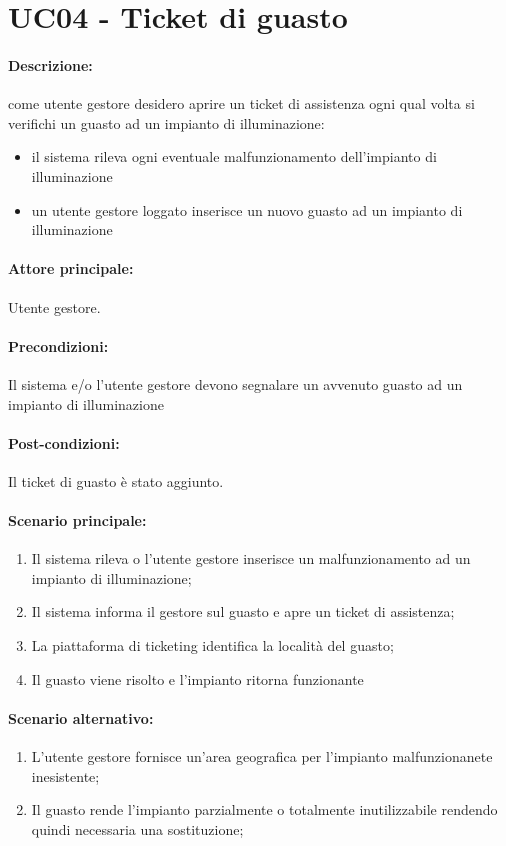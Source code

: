\section{UC04 - Ticket di guasto}

\paragraph{Descrizione:} come utente gestore desidero aprire un ticket di assistenza ogni qual volta si verifichi un guasto ad un impianto di illuminazione:
\begin{itemize}
    \item il sistema rileva ogni
    eventuale malfunzionamento dell’impianto di illuminazione
    \item un utente gestore loggato inserisce un nuovo guasto ad un impianto di illuminazione
\end{itemize}


\paragraph{Attore principale:}
Utente gestore.

\paragraph{Precondizioni:}
Il sistema e/o l'utente gestore devono segnalare un avvenuto guasto ad un impianto di illuminazione

\paragraph{Post-condizioni:}
Il ticket di guasto è stato aggiunto.

\paragraph{Scenario principale:}
\begin{enumerate}
    \item Il sistema rileva o l'utente gestore inserisce un malfunzionamento ad un impianto di illuminazione;
    \item Il sistema informa il gestore sul guasto e apre un ticket di assistenza;
    \item La piattaforma di ticketing identifica la località del guasto;
    \item Il guasto viene risolto e l'impianto ritorna funzionante
\end{enumerate}

\paragraph{Scenario alternativo:}
\begin{enumerate}
    \item L'utente gestore fornisce un'area geografica per l'impianto malfunzionanete inesistente;
    \item Il guasto rende l'impianto parzialmente o totalmente inutilizzabile rendendo quindi necessaria una sostituzione;
\end{enumerate}

